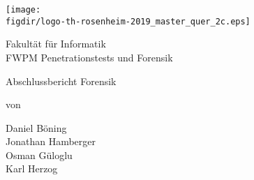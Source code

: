\begin{titlepage}

\sffamily

\raggedleft

\vspace*{-2cm}

\texttt{[image: \\figdir/logo-th-rosenheim-2019\_master\_quer\_2c.eps]}

\vfill

\centering
\LARGE
Fakultät für Informatik  \vspace{0.5cm}\\
\Large
FWPM Penetrationstests und Forensik


\vspace{2cm}

\LARGE

Abschlussbericht Forensik

\vspace{2cm}

\Large


\vspace{1.5cm}


\Large
von

\vspace{0.5cm}


\LARGE
Daniel Böning \vspace{1cm} \\
Jonathan Hamberger \vspace{1cm} \\
Osman Güloglu \vspace{1cm} \\
Karl Herzog \vspace{1cm} \\

\vspace{1cm}

\flushleft
 \Large
\vspace*{\fill}

\end{titlepage}

\cleardoubleemptypage

